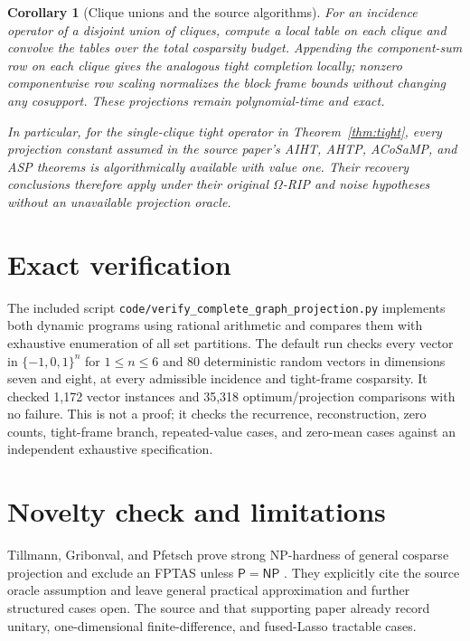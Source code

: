 \documentclass[11pt]{article}
\newtheorem{corollary}{Corollary}
\begin{document}
\begin{corollary}[Clique unions and the source algorithms]
For an incidence operator of a disjoint union of cliques, compute a local
table on each clique and convolve the tables over the total cosparsity budget.
Appending the component-sum row on each clique gives the analogous tight
completion locally; nonzero componentwise row scaling normalizes the block
frame bounds without changing any cosupport. These projections remain
polynomial-time and exact.

In particular, for the single-clique tight operator in
Theorem~\ref{thm:tight}, every projection constant assumed in the source
paper's AIHT, AHTP, ACoSaMP, and ASP theorems is algorithmically available
with value one. Their recovery conclusions therefore apply under their
original $\Omega$-RIP and noise hypotheses without an unavailable projection
oracle.
\end{corollary}

\section{Exact verification}

The included script
\texttt{code/verify\_complete\_graph\_projection.py} implements both
dynamic programs using rational arithmetic and compares them with exhaustive
enumeration of all set partitions. The default run checks every vector in
$\{-1,0,1\}^n$ for $1\le n\le6$ and 80 deterministic random vectors in
dimensions seven and eight, at every admissible incidence and tight-frame
cosparsity. It checked 1,172 vector instances and 35,318 optimum/projection
comparisons with no failure. This is not a proof; it checks the recurrence,
reconstruction, zero counts, tight-frame branch, repeated-value cases, and
zero-mean cases against an independent exhaustive specification.

\section{Novelty check and limitations}

Tillmann, Gribonval, and Pfetsch prove strong NP-hardness of general cosparse
projection and exclude an FPTAS unless $\mathsf P=\mathsf{NP}$
\cite{TillmannEtAl}. They explicitly cite the source oracle assumption and
leave general practical approximation and further structured cases open.
The source and that supporting paper already record unitary, one-dimensional
finite-difference, and fused-Lasso tractable cases.
\end{document}

